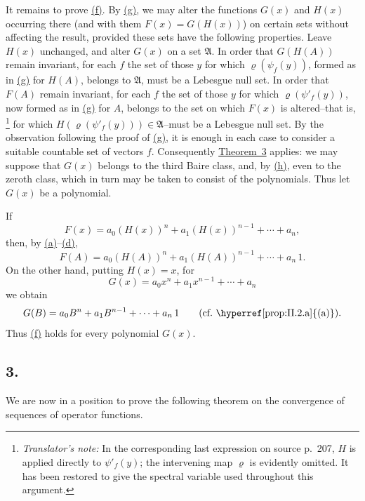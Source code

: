 \documentclass[12pt,b5paper,twoside]{article}
\newcommand{\translatorfootnote}[2]{%
  \begingroup
  \renewcommand{\thefootnote}{#1}%
  \footnote{\hspace{0.8em}\textit{Translator's note:} #2}%
  \endgroup}
\begin{document}
It remains to prove \hyperref[prop:II.2.f]{(f)}.  By
\hyperref[prop:II.2.g]{(g)}, we may alter the functions \(G(x)\) and
\(H(x)\) occurring there (and with them \(F(x)=G(H(x))\)) on certain sets
without affecting the result, provided these sets have the following
properties.  Leave \(H(x)\) unchanged, and alter \(G(x)\) on a set
\(\mathfrak A\).  In order that \(G(H(A))\) remain invariant, for each
\(f\) the set of those \(y\) for which \(\varrho(\psi_f(y))\), formed as in
\hyperref[prop:II.2.g]{(g)} for \(H(A)\), belongs to \(\mathfrak A\),
must be a Lebesgue null set.
In order that \(F(A)\) remain invariant, for each \(f\) the set of those
\(y\) for which \(\varrho(\psi'_f(y))\), now formed as in
\hyperref[prop:II.2.g]{(g)} for \(A\),
belongs to the set on which \(F(x)\) is altered--that is,\translatorfootnote{T6}{In
the corresponding last expression on source p.~207, $H$ is applied directly to
$\psi'_f(y)$; the intervening map $\varrho$ is evidently omitted.  It has been
restored to give the spectral variable used throughout this argument.} for which
\(H(\varrho(\psi'_f(y)))\in\mathfrak A\)--must be a Lebesgue null set.  By
the observation following the proof of \hyperref[prop:II.2.g]{(g)}, it is
enough in each case to
consider a suitable countable set of vectors \(f\).  Consequently
\hyperref[thm:3]{Theorem~3} applies: we may suppose that \(G(x)\) belongs
to the third Baire class, and, by \hyperref[prop:II.2.h]{(h)}, even to the
zeroth class, which in
turn may be taken to consist of the polynomials.  Thus let \(G(x)\) be a
polynomial.

If
\[
 F(x)=a_0(H(x))^n+a_1(H(x))^{n-1}+\cdots+a_n,
\]
then, by \hyperref[prop:II.2.a]{(a)}--\hyperref[prop:II.2.d]{(d)},
\[
 F(A)=a_0(H(A))^n+a_1(H(A))^{n-1}+\cdots+a_n\,1.
\]
On the other hand, putting \(H(x)=x\), for
\[
 G(x)=a_0x^n+a_1x^{n-1}+\cdots+a_n
\]
we obtain
\[
 G(B)=a_0B^n+a_1B^{n-1}+\cdots+a_n\,1
 \qquad\text{(cf.\ \hyperref[prop:II.2.a]{(a)}).}
\]
Thus \hyperref[prop:II.2.f]{(f)} holds for every polynomial \(G(x)\).

\subsection*{3.}\label{sec:II.3}

We are now in a position to prove the following theorem on the convergence
of sequences of operator functions.
\end{document}
